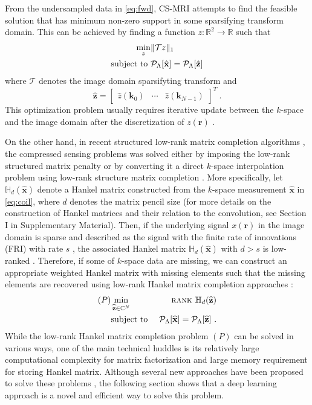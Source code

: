 \documentclass[10pt,journal]{IEEEtran}
\newcommand{\kb}{{\mathbf k}}
\newcommand{\rb}{{\mathbf r}}
\newcommand{\xb}{{\mathbf x}}
\newcommand{\zb}{{\mathbf z}}
\newcommand{\Rd}{{\mathbb R}}
\newcommand{\Cd}{{\mathbb C}}
\newcommand{\0}{{\boldsymbol{0}}}
\newcommand{\rank}{\textsc{rank}}
\newcommand{\hank}{\mathbb{H}}
\newcommand{\Pc}{{\mathcal P}}
\newcommand{\Tc}{{\mathcal T}}
\begin{document}
From the undersampled data in \eqref{eq:fwd}, CS-MRI  \cite{lustig2007sparse,jung2009k} attempts to find the feasible solution  that has minimum non-zero support in some sparsifying
transform domain. This can be achieved
by finding a function $z:\Rd^2\to \Rd$ such that 
\begin{eqnarray}
\min_z &  \|\Tc z\|_1 \notag\\
\mbox{subject to } & \Pc_\Lambda[\hat \xb] = \Pc_\Lambda[\hat \zb]\end{eqnarray}
where $\Tc$ denotes the image domain sparsifyting transform
and 
\begin{equation}\widehat \zb = \begin{bmatrix} \widehat z(\kb_0) & \cdots  & \widehat z(\kb_{N-1}) \end{bmatrix}^T  \  .
\end{equation}
This optimization problem usually requires  iterative update between the $k$-space and the image domain after the discretization of  $z(\rb)$  \cite{lustig2007sparse,jung2009k}.


On the other hand, in  recent structured low-rank  matrix completion algorithms  \cite{shin2014calibrationless,haldar2014low,jin2016general,ongie2016off,ye2016compressive},
the compressed sensing problems was solved either by imposing the low-rank structured matrix penalty \cite{haldar2014low,ongie2016off}
or by converting it a direct $k$-space interpolation problem using low-rank structure matrix completion \cite{shin2014calibrationless,jin2016general}.
More specifically, let $\hank_d(\widehat \xb)$ denote a 
 Hankel matrix constructed from the $k$-space measurement $\widehat \xb$ in \eqref{eq:coil}, where $d$ denotes the
 matrix pencil size (for more details on the construction of Hankel matrices and their relation to the convolution, see Section I in Supplementary Material).
Then,
 if the underlying signal $x(\rb)$ in the image domain is sparse and  described as the signal with the finite rate of innovations (FRI) with rate $s$ \cite{vetterli2002sampling},
  the associated Hankel matrix $\hank_d(\hat \xb)$ with  $d>s$
 is low-ranked  \cite{ye2016compressive,jin2016general,ongie2016off}.
  Therefore, if some of $k$-space data  are missing,
we can construct an appropriate weighted Hankel matrix with missing elements such that the missing elements are recovered 
using low-rank Hankel matrix completion approaches \cite{candes2009exact}:
\begin{eqnarray}\label{eq:EMaC}
(P)
 &\min\limits_{\widehat \zb\in \Cd^N } & \rank~ \hank_d (\widehat \zb)  \\
&\mbox{subject to } & \Pc_\Lambda[\widehat\xb ] = \Pc_\Lambda[\widehat \zb]  \nonumber  \  .
\end{eqnarray}
While the low-rank Hankel matrix completion problem $(P)$  can be solved in various ways, 
one of the main technical huddles is its relatively large computational complexity for matrix factorization and  large memory 
requirement for storing Hankel matrix. 
Although several new approaches have been proposed to solve these problems \cite{ongie2017fast}, the following section shows that a deep learning approach is a novel and efficient way to solve this problem.
\end{document}

